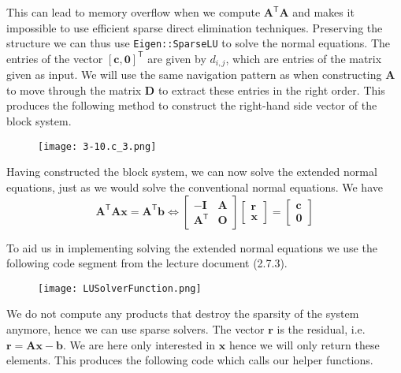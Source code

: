 \documentclass{article}
\begin{document}
\noindent This can lead to memory overflow when we compute $\mathbf{A}^{\mathsf{T}}\mathbf{A}$ and makes it impossible to use efficient sparse direct elimination techniques. Preserving the structure we can thus use \verb|Eigen::SparseLU| to solve the normal equations. The entries of the vector $\left[\mathbf{c}, \mathbf{0}\right]^{\mathsf{T}}$ are given by $d_{i,j}$, which are entries of the matrix given as input. We will use the same navigation pattern as when constructing $\mathbf{A}$ to move through the matrix $\mathbf{D}$ to extract these entries in the right order. This produces the following method to construct the right-hand side vector of the block system.

\begin{figure}[!hbt]
    \centering
\texttt{[image: 3-10.c\_3.png]}
\end{figure}

\noindent Having constructed the block system, we can now solve the extended normal equations, just as we would solve the conventional normal equations. We have 
\begin{equation*}
    \mathbf{A}^{\mathsf{T}}\mathbf{A}\mathbf{x} = \mathbf{A}^{\mathsf{T}}\mathbf{b} \Longleftrightarrow  
    \begin{bmatrix}
        -\mathbf{I} &  \mathbf{A} \\
        \mathbf{A}^{\mathsf{T}} & \mathbf{O}
    \end{bmatrix}
    \begin{bmatrix}
        \mathbf{r} \\
        \mathbf{x}
    \end{bmatrix}
    = 
    \begin{bmatrix}
        \mathbf{c} \\
        \mathbf{0}
    \end{bmatrix}
\end{equation*}

\noindent To aid us in implementing solving the extended normal equations we use the following code segment from the lecture document (2.7.3).

\begin{figure}[!hbt]
    \centering
\texttt{[image: LUSolverFunction.png]}
\end{figure}

\noindent We do not compute any products that destroy the sparsity of the system anymore, hence we can use sparse solvers. The vector $\mathbf{r}$ is the residual, i.e. $\mathbf{r} = \mathbf{A}\mathbf{x} - \mathbf{b}$. We are here only interested in $\mathbf{x}$ hence we will only return these elements. This produces the following code which calls our helper functions.
\end{document}

